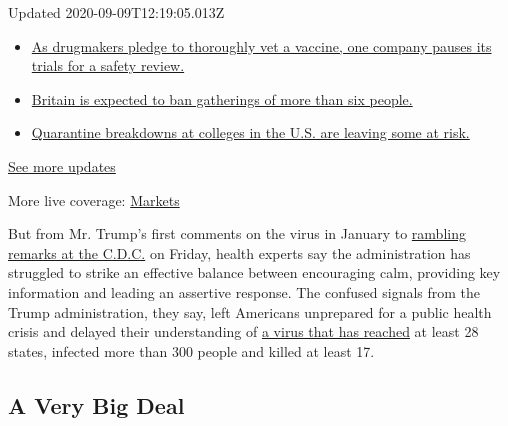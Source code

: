 Updated 2020-09-09T12:19:05.013Z

\begin{itemize}
\tightlist
\item
  \href{https://www.nytimes3xbfgragh.onion/2020/09/09/world/covid-19-coronavirus.html?action=click\&pgtype=Article\&state=default\&region=MAIN_CONTENT_1\&context=storylines_live_updates\#link-70cea8bb}{As
  drugmakers pledge to thoroughly vet a vaccine, one company pauses its
  trials for a safety review.}
\item
  \href{https://www.nytimes3xbfgragh.onion/2020/09/09/world/covid-19-coronavirus.html?action=click\&pgtype=Article\&state=default\&region=MAIN_CONTENT_1\&context=storylines_live_updates\#link-780eaa2f}{Britain
  is expected to ban gatherings of more than six people.}
\item
  \href{https://www.nytimes3xbfgragh.onion/2020/09/09/world/covid-19-coronavirus.html?action=click\&pgtype=Article\&state=default\&region=MAIN_CONTENT_1\&context=storylines_live_updates\#link-11cec4c0}{Quarantine
  breakdowns at colleges in the U.S. are leaving some at risk.}
\end{itemize}

\href{https://www.nytimes3xbfgragh.onion/2020/09/09/world/covid-19-coronavirus.html?action=click\&pgtype=Article\&state=default\&region=MAIN_CONTENT_1\&context=storylines_live_updates}{See
more updates}

More live coverage:
\href{https://www.nytimes3xbfgragh.onion/live/2020/09/09/business/stock-market-today-coronavirus?action=click\&pgtype=Article\&state=default\&region=MAIN_CONTENT_1\&context=storylines_live_updates}{Markets}

But from Mr. Trump's first comments on the virus in January to
\href{https://www.nytimes3xbfgragh.onion/2020/03/06/us/politics/trump-coronavirus-cdc.html}{rambling
remarks at the C.D.C.} on Friday, health experts say the administration
has struggled to strike an effective balance between encouraging calm,
providing key information and leading an assertive response. The
confused signals from the Trump administration, they say, left Americans
unprepared for a public health crisis and delayed their understanding of
\href{https://www.nytimes3xbfgragh.onion/interactive/2020/us/coronavirus-us-cases.html}{a
virus that has reached} at least 28 states, infected more than 300
people and killed at least 17.

\hypertarget{a-very-big-deal}{%
\subsection{A Very Big Deal}\label{a-very-big-deal}}

